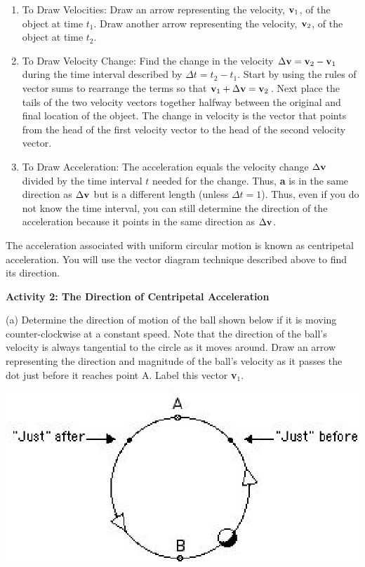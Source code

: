 \begin{enumerate}
\item To Draw Velocities: Draw an arrow representing the velocity, \( 
{\bf v}_{1} \), of
the object at time \( t_{1} \). Draw another arrow representing the velocity,
\( {\bf v}_{2} \), of the object at time \( t_{2} \). 
\item To Draw Velocity Change: Find the change in the velocity 
\( \Delta  {\bf v}
= {\bf v}_{2}  - {\bf v}_{1} \) during the time interval described
by \( \Delta  t = t_{2}  - t_{1} \). Start by using the rules of
vector sums to rearrange the terms so that \({\bf v}_{1}  +  \Delta  
{\bf v}
= {\bf v}_{2} \). Next place the tails of the two velocity vectors together
halfway between the original and final location of the object. The change in
velocity is the vector that points from the head of the first velocity vector
to the head of the second velocity vector. 
\item To Draw Acceleration: The acceleration equals the velocity change 
\( \Delta  {\bf v}\)
divided by the time interval $t$ needed for the change. Thus, \textbf{a} is in
the same direction as \( \Delta  {\bf v}\) but is a different length (unless
\( \Delta  t = 1\)). Thus, even if you do not know the time interval, you
can still determine the direction of the acceleration because it points in the
same direction as \( \Delta  {\bf v}\). 
\end{enumerate}
The acceleration associated with uniform circular motion is known as centripetal
acceleration. You will use the vector diagram technique described above to find
its direction. 

\textbf{Activity 2: The Direction of Centripetal Acceleration }

(a) Determine the direction of motion of the ball shown below if it is moving
counter-clockwise at a constant speed. Note that the direction of the ball's
velocity is always tangential to the circle as it moves around. Draw an arrow
representing the direction and magnitude of the ball's velocity as it passes
the dot just before it reaches point A. Label this vector \textbf{v}\( _{1} \). 

\vspace{0.3cm}
{\par\centering \includegraphics{circ_motion_fig2.eps} \par}
\vspace{0.3cm}

